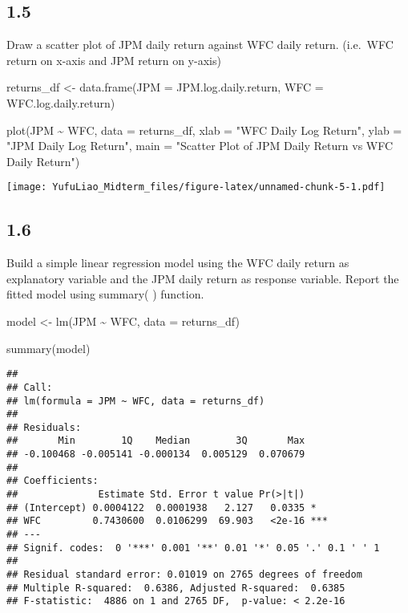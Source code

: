 \documentclass[
]{article}
\newenvironment{Shaded}{\begin{snugshade}}{\end{snugshade}}
\newcommand{\AttributeTok}[1]{\textcolor[rgb]{0.77,0.63,0.00}{#1}}
\newcommand{\FunctionTok}[1]{\textcolor[rgb]{0.00,0.00,0.00}{#1}}
\newcommand{\NormalTok}[1]{#1}
\newcommand{\OtherTok}[1]{\textcolor[rgb]{0.56,0.35,0.01}{#1}}
\newcommand{\SpecialCharTok}[1]{\textcolor[rgb]{0.00,0.00,0.00}{#1}}
\newcommand{\StringTok}[1]{\textcolor[rgb]{0.31,0.60,0.02}{#1}}
\begin{document}
\hypertarget{section-4}{%
\subsection{1.5}\label{section-4}}

Draw a scatter plot of JPM daily return against WFC daily return.
(i.e.~WFC return on x-axis and JPM return on y-axis)

\begin{Shaded}
\begin{Highlighting}[]
\NormalTok{returns\_df }\OtherTok{\textless{}{-}} \FunctionTok{data.frame}\NormalTok{(}\AttributeTok{JPM =}\NormalTok{ JPM.log.daily.return, }\AttributeTok{WFC =}\NormalTok{ WFC.log.daily.return)}

\FunctionTok{plot}\NormalTok{(JPM }\SpecialCharTok{\textasciitilde{}}\NormalTok{ WFC, }\AttributeTok{data =}\NormalTok{ returns\_df, }\AttributeTok{xlab =} \StringTok{"WFC Daily Log Return"}\NormalTok{, }\AttributeTok{ylab =} \StringTok{"JPM Daily Log Return"}\NormalTok{,}
     \AttributeTok{main =} \StringTok{"Scatter Plot of JPM Daily Return vs WFC Daily Return"}\NormalTok{)}
\end{Highlighting}
\end{Shaded}

\texttt{[image: YufuLiao\_Midterm\_files/figure-latex/unnamed-chunk-5-1.pdf]}

\hypertarget{section-5}{%
\subsection{1.6}\label{section-5}}

Build a simple linear regression model using the WFC daily return as
explanatory variable and the JPM daily return as response variable.
Report the fitted model using summary( ) function.

\begin{Shaded}
\begin{Highlighting}[]
\NormalTok{model }\OtherTok{\textless{}{-}} \FunctionTok{lm}\NormalTok{(JPM }\SpecialCharTok{\textasciitilde{}}\NormalTok{ WFC, }\AttributeTok{data =}\NormalTok{ returns\_df)}

\FunctionTok{summary}\NormalTok{(model)}
\end{Highlighting}
\end{Shaded}

\begin{verbatim}
## 
## Call:
## lm(formula = JPM ~ WFC, data = returns_df)
## 
## Residuals:
##       Min        1Q    Median        3Q       Max 
## -0.100468 -0.005141 -0.000134  0.005129  0.070679 
## 
## Coefficients:
##              Estimate Std. Error t value Pr(>|t|)    
## (Intercept) 0.0004122  0.0001938   2.127   0.0335 *  
## WFC         0.7430600  0.0106299  69.903   <2e-16 ***
## ---
## Signif. codes:  0 '***' 0.001 '**' 0.01 '*' 0.05 '.' 0.1 ' ' 1
## 
## Residual standard error: 0.01019 on 2765 degrees of freedom
## Multiple R-squared:  0.6386, Adjusted R-squared:  0.6385 
## F-statistic:  4886 on 1 and 2765 DF,  p-value: < 2.2e-16
\end{verbatim}
\end{document}
